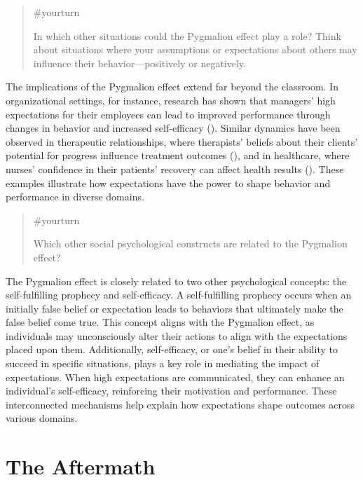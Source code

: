 \documentclass[
  letterpaper,
]{book}
\begin{document}
\begin{quote}
{\#yourturn}

In which other situations could the Pygmalion effect play a role? Think
about situations where your assumptions or expectations about others may
influence their behavior---positively or negatively.
\end{quote}

The implications of the Pygmalion effect extend far beyond the
classroom. In organizational settings, for instance, research has shown
that managers' high expectations for their employees can lead to
improved performance through changes in behavior and increased
self-efficacy (). Similar dynamics
have been observed in therapeutic relationships, where therapists'
beliefs about their clients' potential for progress influence treatment
outcomes (), and in healthcare,
where nurses' confidence in their patients' recovery can affect health
results (). These
examples illustrate how expectations have the power to shape behavior
and performance in diverse domains.

\begin{quote}
{\#yourturn}

Which other social psychological constructs are related to the Pygmalion
effect?
\end{quote}

The Pygmalion effect is closely related to two other psychological
concepts: the self-fulfilling prophecy and self-efficacy. A
self-fulfilling prophecy occurs when an initially false belief or
expectation leads to behaviors that ultimately make the false belief
come true. This concept aligns with the Pygmalion effect, as individuals
may unconsciously alter their actions to align with the expectations
placed upon them. Additionally, self-efficacy, or one's belief in their
ability to succeed in specific situations, plays a key role in mediating
the impact of expectations. When high expectations are communicated,
they can enhance an individual's self-efficacy, reinforcing their
motivation and performance. These interconnected mechanisms help explain
how expectations shape outcomes across various domains.

\section{The Aftermath}\label{the-aftermath}
\end{document}

